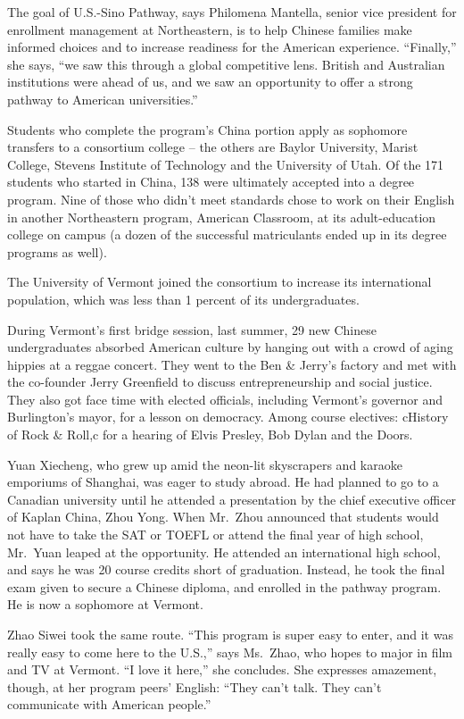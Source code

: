 ﻿\documentclass[12pt]{article}
\begin{document}
The goal of U.S.-Sino Pathway, says Philomena Mantella, senior vice president for enrollment
management at Northeastern, is to help Chinese families make informed choices and to increase
readiness for the American experience. ``Finally,'' she says, ``we saw this through a global
competitive lens. British and Australian institutions were ahead of us, and we saw an opportunity to
offer a strong pathway to American universities.''

Students who complete the program's China portion apply as sophomore transfers to a consortium
college -- the others are Baylor University, Marist College, Stevens Institute of Technology and the
University of Utah. Of the 171 students who started in China, 138 were ultimately accepted into a
degree program. Nine of those who didn't meet standards chose to work on their English in another
Northeastern program, American Classroom, at its adult-education college on campus (a dozen of the
successful matriculants ended up in its degree programs as well).

The University of Vermont joined the consortium to increase its international population, which was
less than 1 percent of its undergraduates.

During Vermont's first bridge session, last summer, 29 new Chinese undergraduates absorbed American
culture by hanging out with a crowd of aging hippies at a reggae concert. They went to the Ben \&
Jerry's factory and met with the co-founder Jerry Greenfield to discuss entrepreneurship and social
justice. They also got face time with elected officials, including Vermont's governor and
Burlington's mayor, for a lesson on democracy. Among course electives: cHistory of Rock \& Roll,c
for a hearing of Elvis Presley, Bob Dylan and the Doors.

Yuan Xiecheng, who grew up amid the neon-lit skyscrapers and karaoke emporiums of Shanghai, was
eager to study abroad. He had planned to go to a Canadian university until he attended a
presentation by the chief executive officer of Kaplan China, Zhou Yong. When Mr.~Zhou announced that
students would not have to take the SAT or TOEFL or attend the final year of high school, Mr.~Yuan
leaped at the opportunity. He attended an international high school, and says he was 20 course
credits short of graduation. Instead, he took the final exam given to secure a Chinese diploma, and
enrolled in the pathway program. He is now a sophomore at Vermont.

Zhao Siwei took the same route. ``This program is super easy to enter, and it was really easy to
come here to the U.S.,'' says Ms.~Zhao, who hopes to major in film and TV at Vermont. ``I love it
here,'' she concludes. She expresses amazement, though, at her program peers' English: ``They can't
talk. They can't communicate with American people.''
\end{document}
